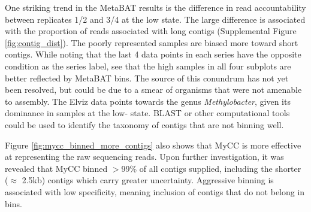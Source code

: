 One striking trend in the MetaBAT results is the difference in read accountability between replicates 1/2 and 3/4 at the low  state. %
The large difference is associated with the proportion of reads associated with long contigs (Supplemental Figure \ref{fig:contig_dist}).
The poorly represented samples are biased more toward short contigs.
While noting that the last 4 data points in each series have the opposite  condition as the series label, see that the high  samples in all four subplots are better reflected by MetaBAT bins.
The source of this conundrum has not yet been resolved, but could be due to a smear of organisms that were not amenable to assembly.
The Elviz data points towards the genus \textit{Methylobacter}, given its dominance in samples at the low- state.
BLAST or other computational tools could be used to identify the taxonomy of contigs that are not binning well. %

Figure \ref{fig:mycc_binned_more_contigs} also shows that MyCC is more effective at representing the raw sequencing reads.
Upon further investigation, it was revealed that MyCC binned $>$99\% of all contigs supplied, including the shorter ($\approx$ 2.5kb) contigs which carry greater uncertainty. %
Aggressive binning is associated with low specificity, meaning inclusion of contigs that do not belong in bins. %

